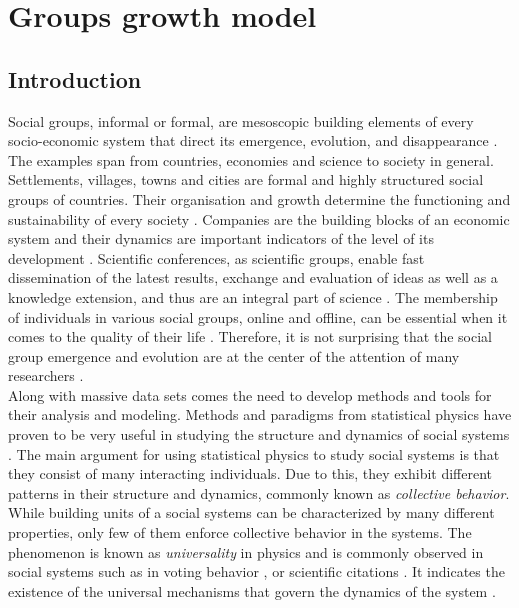
\chapter{Groups growth model} %

\section{Introduction}

Social groups, informal or formal, are mesoscopic building elements of every socio-economic system that direct its emergence, evolution, and disappearance \cite{}. The examples span from countries, economies and science to society in general. Settlements, villages, towns and cities are formal and highly structured social groups of countries. Their organisation and growth determine the functioning and sustainability of every society \cite{barthelemy2016structure}. Companies are the building blocks of an economic system and their dynamics are important indicators of the level of its development \cite{hidalgo2009building}. Scientific conferences, as scientific groups, enable fast dissemination of the latest results, exchange and evaluation of ideas as well as a knowledge extension, and thus are an integral part of science \cite{smiljanic2016theoretical}. The membership of individuals in various social groups, online and offline, can be essential when it comes to the quality of their life \cite{montazeri2001anxiety, davison2000talks, cho2012tea}. Therefore, it is not surprising that the social group emergence and evolution are at the center of the attention of many researchers \cite{aral2012identifying,gonzalez2013broadcasters, torok2013opinions, yasseri2012dynamics}.\\

Along with massive data sets comes the need to develop methods and tools for their analysis and modeling. Methods and paradigms from statistical physics have proven to be very useful in studying the structure and dynamics of social systems \cite{castellano2009statistical}. The main argument for using statistical physics to study social systems is that they consist of many interacting individuals. Due to this, they exhibit different patterns in their structure and dynamics, commonly known as \textit{collective behavior}. While building units of a social systems can be characterized by many different properties, only few of them enforce collective behavior in the systems. The phenomenon is known as \textit{universality} in physics and is commonly observed in social systems such as in voting behavior \cite{chatterjee2013universality}, or scientific citations \cite{radicchi2008universality}. It indicates the existence of the universal mechanisms that govern the dynamics of the system \cite{}.\\  


